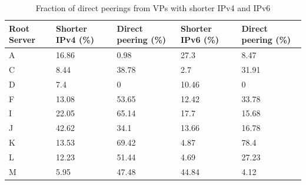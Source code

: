 \begin{table}
	\centering
	\begin{tabular}{C{1.5cm}  C{2cm} C{2.5cm} |C{2.5cm} C{2.5cm} }
		\hline
		\textbf{Root Server} & \textbf{Shorter IPv4 (\%)}	& \textbf{Direct peering (\%)} & \textbf{Shorter IPv6 (\%)} & \textbf{Direct peering (\%)} \\ \hline\hline
		A	& 16.86	& 0.98	& 27.3 	& 8.47  \\ \hline
		C	& 8.44	& 38.78 & 2.7 	& 31.91 \\ \hline
		D	& 7.4	& 0 	& 10.46 & 0 	\\ \hline
		F	& 13.08	& 53.65 & 12.42 & 33.78 \\ \hline
		I	& 22.05	& 65.14 & 17.7  & 15.68 \\ \hline
		J	& 42.62	& 34.1 	& 13.66	& 16.78	\\ \hline
		K	& 13.53	& 69.42 & 4.87	& 78.4  \\ \hline
		L	& 12.23	& 51.44 & 4.69	& 27.23	\\ \hline
		M	& 5.95	& 47.48 & 44.84	& 4.12	\\ \hline
	\end{tabular}
	\caption{Fraction of direct peerings from VPs with shorter IPv4 and IPv6}
	\label{table:ch04:direct-peering}
\end{table}

 






